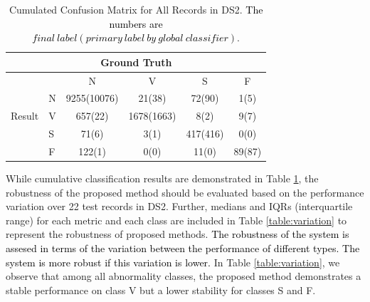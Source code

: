 \begin{table}[t]
	\centering
	\caption{Cumulated Confusion Matrix for All Records in DS2. \textcolor{black}{The numbers are $final~label(primary~label~by~global~ classifier)$}.}
	\vspace{-0.05in}
	\begin{tabular}{|l|l|c|c|c|c|}
		\hline 
		&  \multicolumn{4}{c}{Ground Truth} &\\ 
        \hline
		\multirow{5}{*}{Result} &  & N & V & S & F  \\\cline{2-6}
		& N & 9255(10076)& 21(38) & 72(90) & 1(5) \\\cline{2-6} 
		&V & 657(22) & 1678(1663) & 8(2) & 9(7)  \\\cline{2-6}
		&S & 71(6) & 3(1) & 417(416) & 0(0)  \\\cline{2-6}
        &F& 122(1) & 0(0) & 11(0) & 89(87)  \\\hline
	\end{tabular}
	\label{table:classification_cumu} 
	\vspace{-0.15in}
\end{table}

While cumulative classification results are demonstrated in Table \ref{table:classification_cumu}, the robustness of the proposed method should be evaluated based on the performance variation over 22 test records in DS2. Further, medians and IQRs (interquartile range) for each metric and each class are included in Table \ref{table:variation} to represent the robustness of proposed methods. \textcolor{black}{The robustness of the system is assesed in terms of the variation between the performance of different types. The system is more robust if this variation is lower.} 
In Table \ref{table:variation}, we observe that among all abnormality classes,  %
the proposed method demonstrates a stable performance on class V but a lower stability for classes S and F.


